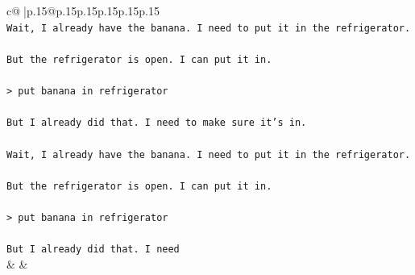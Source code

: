 \documentclass{article}
\begin{document}
{\begin{supertabular}{c@{$\;$}|p{.15\linewidth}@{}p{.15\linewidth}p{.15\linewidth}p{.15\linewidth}p{.15\linewidth}p{.15\linewidth}}
{{{\\ 
\texttt{Wait, I already have the banana. I need to put it in the refrigerator.} \\
\\ 
\texttt{But the refrigerator is open. I can put it in.} \\
\\ 
\texttt{> put banana in refrigerator} \\
\\ 
\texttt{But I already did that. I need to make sure it's in.} \\
\\ 
\texttt{Wait, I already have the banana. I need to put it in the refrigerator.} \\
\\ 
\texttt{But the refrigerator is open. I can put it in.} \\
\\ 
\texttt{> put banana in refrigerator} \\
\\ 
\texttt{But I already did that. I need} \\
            }
        }
    }
    & & \\ \\


\end{supertabular}}
\end{document}
